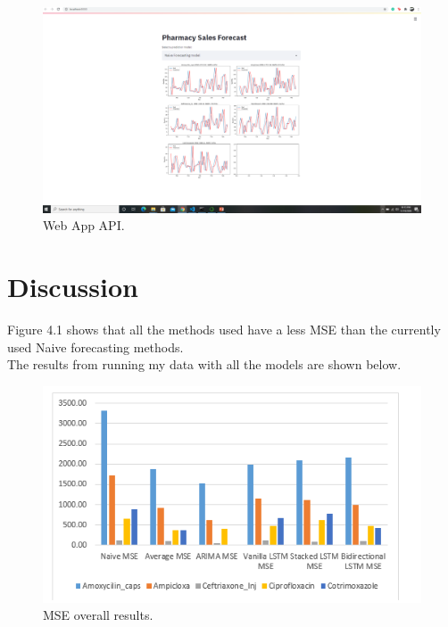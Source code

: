 \documentclass[12pt]{report}
\begin{document}
\begin{figure}[H]%
  \begin {center}
  \includegraphics[width=1\textwidth]{images/WebApp.PNG}
  \caption{Web App API.}
  \label{fig:ecg}
  \end {center}
  \end{figure}

\chapter{Discussion}

Figure 4.1 shows that all the methods used have a less MSE than the currently used Naive forecasting methods.\\
The results from running my data with all the models are shown below.


\begin{figure}[H]%
\begin {center}
\includegraphics[width=1\textwidth]{images/chart.png}
\caption{MSE overall results.}
\label{fig:ecg}
\end {center}
\end{figure}
\end{document}
